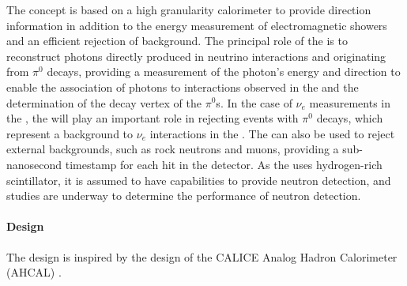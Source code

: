 
The   concept is based on a high granularity calorimeter to provide direction information in addition to the energy measurement of electromagnetic showers and an efficient rejection of background. The principal role of the  is to reconstruct photons directly produced in neutrino interactions and originating from $\pi^0$ decays, providing a measurement of the photon's energy and direction to enable the association of photons to interactions observed in the  and the determination of the decay vertex of the $\pi^0$s. In the case of $\nu_e$ measurements in the , the  will play an important role in rejecting events with $\pi^0$ decays, which represent a background to $\nu_e$ interactions in the . The  can also be used to reject external backgrounds, such as rock neutrons and muons, providing a sub-nanosecond timestamp \cite{Simon:2013zya} for each hit in the detector. As the  uses hydrogen-rich scintillator, it is assumed to have capabilities to provide neutron detection, and studies are underway to determine the performance of neutron detection.

\paragraph{ Design}

The  design is inspired by the design of the CALICE Analog Hadron Calorimeter (AHCAL) \cite{collaboration:2010hb}. %

